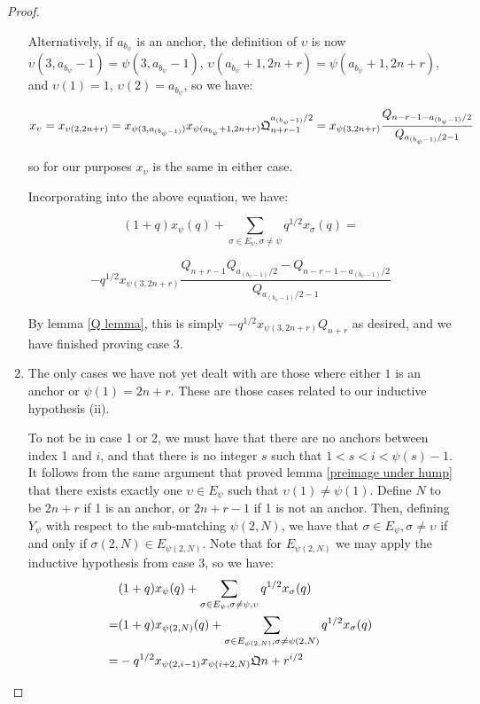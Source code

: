 \documentclass{amsart}
\begin{document}
\begin{proof}
\begin{enumerate}[label={case \arabic*:}]
		Alternatively, if $a_{b_\psi}$ is an anchor, the definition of $\upsilon$ is now $\upsilon(3,a_{b_\psi}-1)=\psi(3,a_{b_\psi}-1)$, $\upsilon(a_{b_\psi}+1,2n+r)=\psi(a_{b_\psi}+1,2n+r)$, and $\upsilon(1)=1$, $\upsilon(2)=a_{b_\psi}$, so we have:
		
		$$x_\upsilon=x_{\upsilon(2,2n+r)}=x_{\psi(3,a_{(b_\psi-1)})}x_{\psi(a_{b_\psi}+1,2n+r)}\mathfrak{Q}_{n+r-1}^{a_{(b_\psi-1)}/2}=x_{\psi(3,2n+r)}\frac{Q_{n-r-1-a_{(b_\psi-1)}/2}}{Q_{a_{(b_\psi-1)}/2-1}}$$
		
		so for our purposes $x_\upsilon$ is the same in either case.
		
		Incorporating into the above equation, we have:
		
		$$(1+q)x_\psi(q)+\sum_{\sigma\in E_\psi,\sigma\not=\psi}q^{1/2}x_\sigma(q)=$$
		
		
		$$-q^{1/2}x_{\psi(3,2n+r)}\frac{Q_{n+r-1}Q_{a_{(b_\psi-1)}/2}-Q_{n-r-1-a_{(b_\psi-1)}/2}}{Q_{a_{(b_\psi-1)}/2-1}}$$	
		
		By lemma \ref{Q lemma}, this is simply $-q^{1/2}x_{\psi(3,2n+r)}Q_{n+r}$ as desired, and we have finished proving case 3.
		\\
		
		\item The only cases we have not yet dealt with are those where either $1$ is an anchor or $\psi(1)=2n+r$. These are those cases related to our inductive hypothesis (ii).
		
		To not be in case 1 or 2, we must have that there are no anchors between index 1 and $i$, and that there is no integer $s$ such that $1<s<i<\psi(s)-1$. It follows from the same argument that proved lemma \ref{preimage under hump} that there exists exactly one $\upsilon\in E_\psi$ such that $\upsilon(1)\not=\psi(1)$. Define $N$ to be $2n+r$ if 1 is an anchor, or $2n+r-1$ if 1 is not an anchor. Then, defining $Y_\psi$ with respect to the sub-matching $\psi(2,N)$, we have that $\sigma\in E_\psi, \sigma\not=\upsilon$ if and only if $\sigma(2,N)\in E_{\psi(2,N)}$. Note that for $E_{\psi(2,N)}$ we may apply the inductive hypothesis from case 3, so we have:
		\begin{align*}
		&(1+q)x_\psi(q)+\sum_{\sigma\in E_\psi,\sigma\not=\psi,\upsilon}q^{1/2}x_\sigma(q)\\
		=&(1+q)x_{\psi(2,N)}(q)+\sum_{\sigma\in E_{\psi(2,N)},\sigma\not=\psi(2,N)}q^{1/2}x_{\sigma}(q)\\
		=&-q^{1/2}x_{\psi(2,i-1)}x_{\psi(i+2,N)}\mathfrak{Q}{n+r}^{i/2}
		\end{align*}
		

\end{enumerate}
\end{proof}
\end{document}
